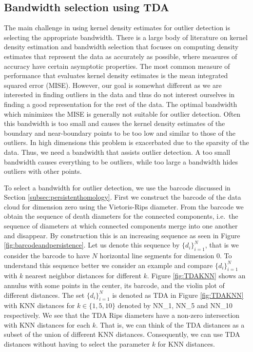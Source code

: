 \documentclass[11pt,a4paper,]{article}
\theoremstyle{definition}
\theoremstyle{definition}
\theoremstyle{definition}
\theoremstyle{remark}
\begin{document}
\hypertarget{bandwidth-selection-using-tda}{%
\subsection{\texorpdfstring{Bandwidth selection using TDA \label{subsec:selectingBandwidth}}{Bandwidth selection using TDA }}\label{bandwidth-selection-using-tda}}

The main challenge in using kernel density estimates for outlier detection is selecting the appropriate bandwidth. There is a large body of literature on kernel density estimation and bandwidth selection \autocite{Scott1994,Wang2019} that focuses on computing density estimates that represent the data as accurately as possible, where measures of accuracy have certain asymptotic properties. The most common measure of performance that evaluates kernel density estimates is the mean integrated squared error (MISE). However, our goal is somewhat different as we are interested in finding outliers in the data and thus do not interest ourselves in finding a good representation for the rest of the data. The optimal bandwidth which minimizes the MISE is generally not suitable for outlier detection. Often this bandwidth is too small and causes the kernel density estimates of the boundary and near-boundary points to be too low and similar to those of the outliers. In high dimensions this problem is exacerbated due to the sparsity of the data. Thus, we need a bandwidth that assists outlier detection. A too small bandwidth causes everything to be outliers, while too large a bandwidth hides outliers with other points.

To select a bandwidth for outlier detection, we use the barcode discussed in Section \ref{subsec:persistenthomology}. First we construct the barcode of the data cloud for dimension zero using the Vietoris-Rips diameter. From the barcode we obtain the sequence of death diameters for the connected components, i.e.~the sequence of diameters at which connected components merge into one another and disappear. By construction this is an increasing sequence as seen in Figure \ref{fig:barcodeandpersistence}. Let us denote this sequence by \(\{d_i\}_{i = 1}^N\), that is we consider the barcode to have \(N\) horizontal line segments for dimension \(0\). To understand this sequence better we consider an example and compare \(\{d_i\}_{i = 1}^N\) with \(k\) nearest neighbor distances for different \(k\). Figure \ref{fig:TDAKNN} shows an annulus with some points in the center, its barcode, and the violin plot of different distances. The set \(\{d_i\}_{i = 1}^N\) is denoted as TDA in Figure \ref{fig:TDAKNN} with KNN distances for \(k \in \{1, 5, 10\}\) denoted by NN\_1, NN\_5 and NN\_10 respectively. We see that the TDA Rips diameters have a non-zero intersection with KNN distances for each \(k\). That is, we can think of the TDA distances as a subset of the union of different KNN distances. Consequently, we can use TDA distances without having to select the parameter \(k\) for KNN distances.
\end{document}
